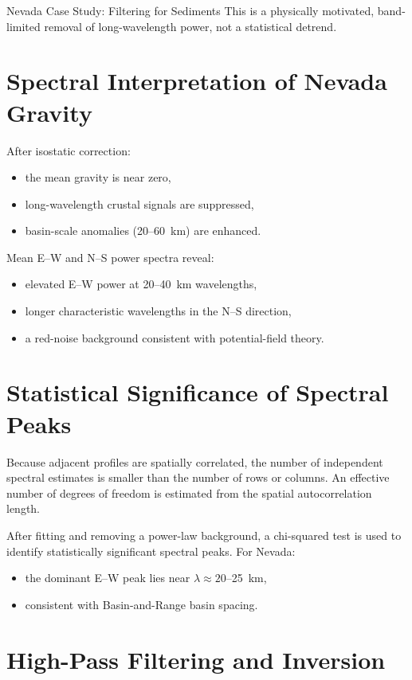 \begin{activity}{Nevada Case Study: Filtering for Sediments}
This is a physically motivated, band-limited removal of long-wavelength power,
not a statistical detrend.

\section*{Spectral Interpretation of Nevada Gravity}

After isostatic correction:
\begin{itemize}
  \item the mean gravity is near zero,
  \item long-wavelength crustal signals are suppressed,
  \item basin-scale anomalies (20--60~km) are enhanced.
\end{itemize}

Mean E--W and N--S power spectra reveal:
\begin{itemize}
  \item elevated E--W power at 20--40~km wavelengths,
  \item longer characteristic wavelengths in the N--S direction,
  \item a red-noise background consistent with potential-field theory.
\end{itemize}

\section*{Statistical Significance of Spectral Peaks}

Because adjacent profiles are spatially correlated,
the number of independent spectral estimates is smaller than the number of rows or columns.
An effective number of degrees of freedom is estimated from the spatial autocorrelation length.

After fitting and removing a power-law background,
a chi-squared test is used to identify statistically significant spectral peaks.
For Nevada:
\begin{itemize}
  \item the dominant E--W peak lies near $\lambda \approx 20$--25~km,
  \item consistent with Basin-and-Range basin spacing.
\end{itemize}

\section*{High-Pass Filtering and Inversion}


\end{activity}
